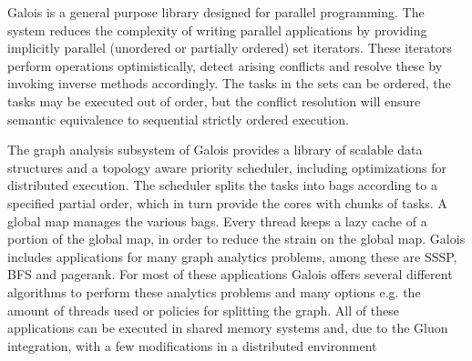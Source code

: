 Galois \cite{origGalois} is a general purpose library designed for parallel programming. The system reduces the complexity of writing parallel applications by providing implicitly parallel (unordered or partially ordered) set iterators. These iterators perform operations optimistically, detect arising conflicts and resolve these by invoking inverse methods accordingly. The tasks in the sets can be ordered, the tasks may be executed out of order, but the conflict resolution will ensure semantic equivalence to sequential strictly ordered execution.


The graph analysis subsystem of Galois \cite{Galois} provides a library of scalable data structures and a topology aware priority scheduler, including optimizations for distributed execution. The scheduler splits the tasks into bags according to a specified partial order, which in turn provide the cores with chunks of tasks. A global map manages the various bags. Every thread keeps a lazy cache of a portion of the global map, in order to reduce the strain on the global map. Galois includes applications for many graph analytics problems, among these are SSSP, BFS and pagerank. For most of these applications Galois offers several different algorithms to perform these analytics problems and many options e.g. the amount of threads used or policies for splitting the graph. All of these applications can be executed in shared memory systems and, due to the Gluon integration, with a few modifications in a distributed environment


